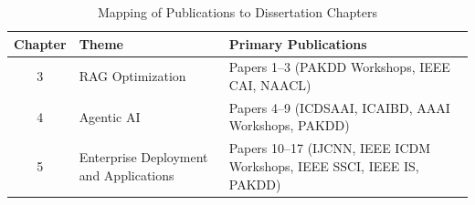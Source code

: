 \begin{table}[htbp]
\centering
\caption{Mapping of Publications to Dissertation Chapters}
\label{tab:publications_mapping}
\small
\begin{tabular}{@{}clp{5cm}@{}}
\toprule
\textbf{Chapter} & \textbf{Theme} & \textbf{Primary Publications} \\
\midrule
3 & RAG Optimization & Papers 1--3 (PAKDD Workshops, IEEE CAI, NAACL) \\
4 & Agentic AI & Papers 4--9 (ICDSAAI, ICAIBD, AAAI Workshops, PAKDD) \\
5 & Enterprise Deployment and Applications & Papers 10--17 (IJCNN, IEEE ICDM Workshops, IEEE SSCI, IEEE IS, PAKDD) \\
\bottomrule
\end{tabular}
\end{table}


